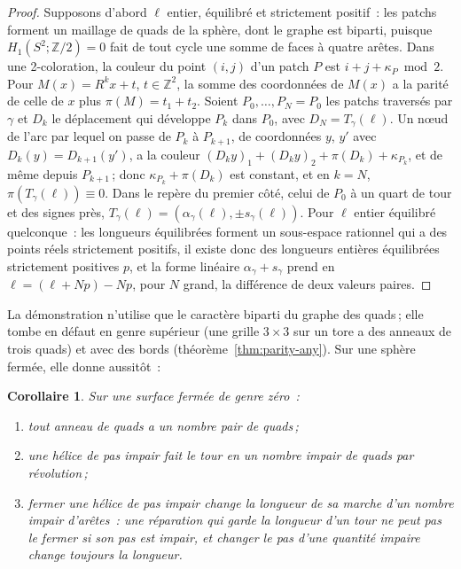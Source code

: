 \documentclass[11pt,a4paper]{article}
\newtheorem{corollary}{Corollaire}
\newcommand{\Z}{\mathbb{Z}}
\newcommand{\shift}{s}
\begin{document}
\begin{proof}
Supposons d'abord $\ell$ entier, équilibré et strictement positif~: les
patchs forment un maillage de quads de la sphère, dont le graphe est biparti,
puisque $H_1(S^2; \Z/2) = 0$ fait de tout cycle une somme de faces à quatre
arêtes. Dans une 2-coloration, la couleur du point $(i, j)$ d'un patch $P$ est
$i + j + \kappa_P \bmod 2$. Pour $M(x) = R^k x + t$, $t \in \Z^2$, la somme
des coordonnées de $M(x)$ a la parité de celle de $x$ plus $\pi(M) = t_1 +
t_2$. Soient $P_0, \dots, P_N = P_0$ les patchs traversés par $\gamma$ et
$D_k$ le déplacement qui développe $P_k$ dans $P_0$, avec $D_N =
T_\gamma(\ell)$. Un nœud de l'arc par lequel on passe de $P_k$ à $P_{k+1}$, de
coordonnées $y$, $y'$ avec $D_k(y) = D_{k+1}(y')$, a la couleur $(D_k y)_1 +
(D_k y)_2 + \pi(D_k) + \kappa_{P_k}$, et de même depuis $P_{k+1}$\,; donc
$\kappa_{P_k} + \pi(D_k)$ est constant, et en $k = N$, $\pi(T_\gamma(\ell))
\equiv 0$. Dans le repère du premier côté, celui de $P_0$ à un quart de tour
et des signes près, $T_\gamma(\ell) = (\alpha_\gamma(\ell),
\pm\shift_\gamma(\ell))$. Pour $\ell$ entier équilibré quelconque~: les
longueurs équilibrées forment un sous-espace rationnel qui a des points réels
strictement positifs, il existe donc des longueurs entières équilibrées
strictement positives $p$, et la forme linéaire $\alpha_\gamma +
\shift_\gamma$ prend en $\ell = (\ell + Np) - Np$, pour $N$ grand, la
différence de deux valeurs paires.
\end{proof}

La démonstration n'utilise que le caractère biparti du graphe des quads\,;
elle tombe en défaut en genre supérieur (une grille $3 \times 3$ sur un tore a
des anneaux de trois quads) et avec des bords
(théorème~\ref{thm:parity-any}). Sur une sphère fermée, elle donne aussitôt~:

\begin{corollary}\label{cor:parity}
Sur une surface fermée de genre zéro~:
\begin{enumerate}
\item[(a)] tout anneau de quads a un nombre pair de quads\,;
\item[(b)] une hélice de pas impair fait le tour en un nombre impair de quads
  par révolution\,;
\item[(c)] fermer une hélice de pas impair change la longueur de sa marche
  d'un nombre impair d'arêtes~: une réparation qui garde la longueur d'un tour
  ne peut pas le fermer si son pas est impair, et changer le pas d'une
  quantité impaire change toujours la longueur.
\end{enumerate}
\end{corollary}
\end{document}
